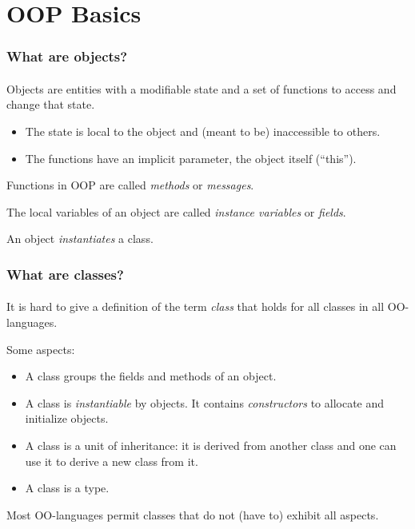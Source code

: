 \documentclass{beamer}
\begin{document}
\section{OOP Basics}
\begin{frame}[fragile]
\frametitle{What are objects? }
\framesubtitle{}
Objects are entities with a modifiable state and a set of functions to access
and change that state.
\begin{itemize}
\item The state is local to the object and (meant to be) inaccessible to 
others.
\item The functions have an implicit parameter, the object itself (``this'').
\end{itemize}

Functions in OOP are called \textit{methods} or \textit{messages}.
\bigskip

The local variables of an object are called \textit{instance variables}
or \textit{fields}.
\bigskip

An object \textit{instantiates} a class.
\end{frame}



\begin{frame}[fragile]
\frametitle{What are classes?}
\framesubtitle{}
It is hard to give a definition of the term \textit{class} that holds
for all classes in all OO-languages. 

\bigskip

Some aspects:

\begin{itemize}
\item A class groups the fields and methods of an object.
\item A class is \textit{instantiable} by objects.
It contains \textit{constructors} to allocate and initialize objects.
\item A class is a unit of inheritance: it is derived from another
class and one can use it to derive a new class from it. 
\item A class is a type. 
\end{itemize}
\bigskip

Most OO-languages permit classes that do not (have to) exhibit 
all aspects. 
\end{frame}
\end{document}
